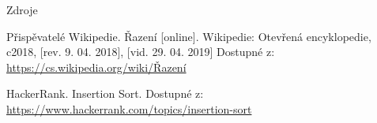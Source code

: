 \documentclass{beamer}
\begin{document}
\begin{frame}{Zdroje}
\begin{thebibliography}{9}
Přispěvatelé Wikipedie. Řazení [online]. Wikipedie: Otevřená encyklopedie, c2018, [rev. 9. 04. 2018], [vid. 29. 04. 2019] Dostupné z: \href{https://cs.wikipedia.org/wiki/Řazení}{https://cs.wikipedia.org/wiki/Řazení}

HackerRank. Insertion Sort. Dostupné z: \href{https://www.hackerrank.com/topics/insertion-sort}{https://www.hackerrank.com/topics/insertion-sort}

\end{thebibliography}
\end{frame}
\end{document}
